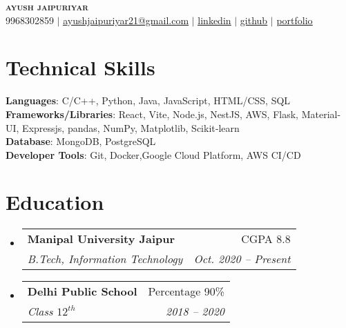 \documentclass[a4paper,11pt]{article}
\makeatletter
\newcommand{\resumeSubheading}[4]{
    \vspace{-2pt}\item
    \begin{tabular*}{0.97\textwidth}[t]{l@{\extracolsep{\fill}}r}
        \textbf{#1} & #2 \\
        \textit{\small#3} & \textit{\small #4} \\
    \end{tabular*}\vspace{-7pt}
}
\newcommand{\resumeSubHeadingListStart}{\begin{itemize}[leftmargin=0.15in, label={}]}
\newcommand{\resumeSubHeadingListEnd}{\end{itemize}}
\makeatother
\begin{document}

\begin{center}
	\textbf{\Huge \scshape ayush jaipuriyar} \\ \vspace{1pt}
	\small 9968302859 $|$ \href{mailto:ayushjaipuriyar21@gmail.com}{\underline{ayushjaipuriyar21@gmail.com}} $|$
	\href{https://www.linkedin.com/in/ayushjaipuriyar}{\underline{linkedin}} $|$
	\href{https://github.com/ayushjaipuriyar/}{\underline{github}} $|$
	\href{https://portfolio-ayushjaipuriyar.vercel.app/}{\underline{portfolio}}
\end{center}

%
\section{Technical Skills}
\begin{itemize}[leftmargin=0.15in, label={}]
	\small{
		\item{
		            \textbf{Languages}{: C/C++, Python, Java, JavaScript, HTML/CSS, SQL} \\
		            \textbf{Frameworks/Libraries}{: React, Vite, Node.js, NestJS, AWS, Flask, Material-UI, Expressjs, pandas, NumPy, Matplotlib, Scikit‑learn} \\
		            \textbf{Database}{: MongoDB, PostgreSQL} \\
		            \textbf{Developer Tools}{: Git, Docker,Google Cloud Platform, AWS CI/CD} \\
		      }
	}
\end{itemize}

%

\section{Education}
\resumeSubHeadingListStart
\resumeSubheading
{Manipal University Jaipur}{CGPA 8.8}
{B.Tech, Information Technology}{Oct. 2020 -- Present}
\resumeSubheading
{Delhi Public School}{Percentage 90\%}
{Class $12^{th}$}{2018 -- 2020}
\resumeSubHeadingListEnd
\end{document}
